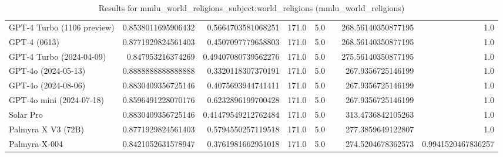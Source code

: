 \begin{table}[htp]
{\begin{tabular}{lrrrrrrr}
GPT-4 Turbo (1106 preview) & 0.8538011695906432 & 0.5664703581068251 & 171.0 & 5.0 &  & 268.56140350877195 & 1.0 \\
GPT-4 (0613) & 0.8771929824561403 & 0.4507097779658803 & 171.0 & 5.0 &  & 268.56140350877195 & 1.0 \\
GPT-4 Turbo (2024-04-09) & 0.847953216374269 & 0.49407080739562276 & 171.0 & 5.0 &  & 275.56140350877195 & 1.0 \\
GPT-4o (2024-05-13) & 0.8888888888888888 & 0.3320118307370191 & 171.0 & 5.0 &  & 267.9356725146199 & 1.0 \\
GPT-4o (2024-08-06) & 0.8830409356725146 & 0.4075693944741411 & 171.0 & 5.0 &  & 267.9356725146199 & 1.0 \\
GPT-4o mini (2024-07-18) & 0.8596491228070176 & 0.6232896199700428 & 171.0 & 5.0 &  & 267.9356725146199 & 1.0 \\
Solar Pro & 0.8830409356725146 & 0.41479549212762484 & 171.0 & 5.0 &  & 313.4736842105263 & 1.0 \\
Palmyra X V3 (72B) & 0.8771929824561403 & 0.5794550257119518 & 171.0 & 5.0 &  & 277.3859649122807 & 1.0 \\
Palmyra-X-004 & 0.8421052631578947 & 0.3761981662951018 & 171.0 & 5.0 &  & 274.5204678362573 & 0.9941520467836257 \\
\bottomrule
\end{tabular}}
\caption{Results for mmlu_world_religions_subject:world_religions (mmlu_world_religions)}
\label{fig:mmlu_world_religions_subject:world_religions (mmlu_world_religions)}
\end{table}